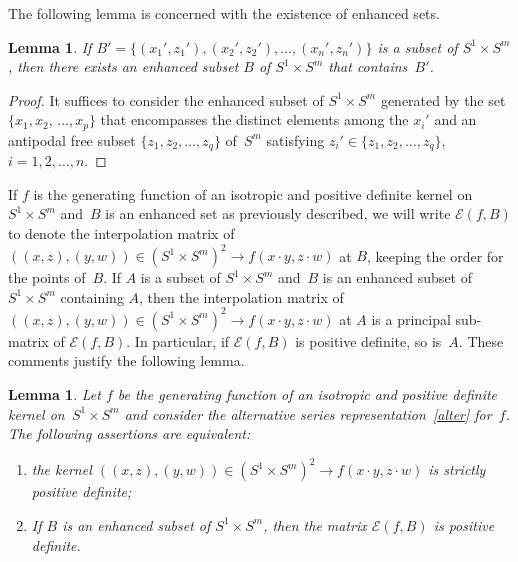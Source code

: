 \documentclass[pdftex]{sigma}
\numberwithin{equation}{section}
\newtheorem{Lemma}[Theorem]{Lemma}
\begin{document}
The following lemma is concerned with the existence of enhanced sets.

\begin{Lemma} \label{key1Lemma} If $B'=\{(x_1',z_1'),(x_2',z_2'), \ldots, (x_n',z_n')\}$ is a subset of $S^1 \times S^m$, then there exists an enhanced subset $B$ of $S^1 \times S^m$ that contains~$B'$.
\end{Lemma}
\begin{proof}
It suf\/f\/ices to consider the enhanced subset of $S^1 \times S^m$ generated by the set $\{x_1,x_2$, $\ldots, x_p\}$ that encompasses the distinct elements among the $x_i'$ and an antipodal free subset $\{z_1,z_2, \ldots, z_q\}$ of~$S^m$ satisfying $z_i' \in \{z_1,z_2, \ldots, z_q\}$, $i=1,2,\ldots,n$.
\end{proof}

If $f$ is the generating function of an isotropic and positive def\/inite kernel on $S^1 \times S^m$ and~$B$ is an enhanced set as previously described, we will write $\mathcal{E}(f,B)$ to denote the interpolation matrix of $((x,z), (y,w)) \in (S^1 \times S^m)^2 \to f(x \cdot y, z \cdot w)$ at $B$, keeping the order for the points of~$B$. If $A$ is a subset of $S^1 \times S^m$ and~$B$ is an enhanced subset of $S^1 \times S^m$ containing $A$, then the interpolation matrix of $((x,z), (y,w)) \in (S^1 \times S^m)^2 \to f(x \cdot y, z \cdot w)$ at $A$ is a principal sub-matrix of $\mathcal{E}(f,B)$. In particular, if $\mathcal{E}(f,B)$ is positive def\/inite, so is~$A$. These comments justify the following lemma.

\begin{Lemma}\label{augmentation}
Let $f$ be the generating function of an isotropic and positive definite kernel on~\mbox{$S^1 \times S^m$} and consider the alternative series representation~\eqref{alter} for~$f$. The following assertions are equivalent:
\begin{enumerate}\itemsep=0pt
\item[$(i)$] the kernel $((x,z), (y,w)) \in (S^1 \times S^m)^2 \to f(x \cdot y, z \cdot w)$ is strictly positive definite;
\item[$(ii)$] If $B$ is an enhanced subset of $S^1 \times S^m$, then the matrix $\mathcal{E}(f,B)$ is positive definite.
\end{enumerate}
\end{Lemma}
\end{document}
